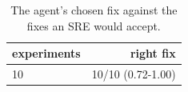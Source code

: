 \begin{table}[t]
\centering\small
\caption{The agent's chosen fix against the fixes an SRE would accept.}\label{tab:rq3_action_selection}
\begin{tabular}{lr}
\toprule
experiments & right fix \\
\midrule
10 & 10/10 (0.72-1.00) \\
\bottomrule
\end{tabular}
\end{table}
